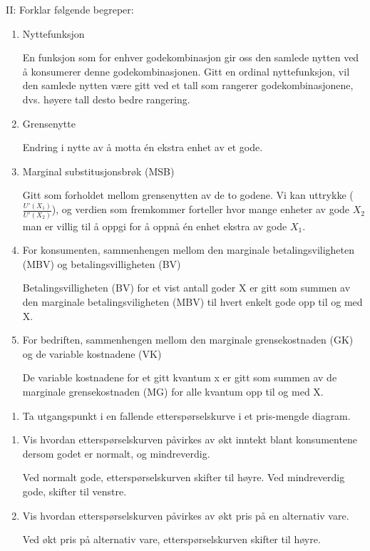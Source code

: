 \documentclass[
  letterpaper,
  DIV=11,
  numbers=noendperiod]{scrartcl}
\providecommand{\tightlist}{%
  \setlength{\itemsep}{0pt}\setlength{\parskip}{0pt}}\usepackage{longtable,booktabs,array}
\begin{document}
II: Forklar følgende begreper:

\begin{enumerate}
\def\labelenumi{\alph{enumi}.}
\tightlist
\item
  Nyttefunksjon

  En funksjon som for enhver godekombinasjon gir oss den samlede nytten
  ved å konsumerer denne godekombinasjonen. Gitt en ordinal
  nyttefunksjon, vil den samlede nytten være gitt ved et tall som
  rangerer godekombinasjonene, dvs. høyere tall desto bedre rangering.
\item
  Grensenytte

  Endring i nytte av å motta én ekstra enhet av et gode.
\item
  Marginal substitusjonsbrøk (MSB)

  Gitt som forholdet mellom grensenytten av de to godene. Vi kan
  uttrykke (\(\frac{U'(X_{1})}{U'(X_{2})}\)), og verdien som fremkommer
  forteller hvor mange enheter av gode \(X_{2}\) man er villig til å
  oppgi for å oppnå én enhet ekstra av gode \(X_{1}\).
\item
  For konsumenten, sammenhengen mellom den marginale betalingsviligheten
  (MBV) og betalingsvilligheten (BV)

  Betalingsvilligheten (BV) for et vist antall goder X er gitt som
  summen av den marginale betalingsviligheten (MBV) til hvert enkelt
  gode opp til og med X.
\item
  For bedriften, sammenhengen mellom den marginale grensekostnaden (GK)
  og de variable kostnadene (VK)

  De variable kostnadene for et gitt kvantum x er gitt som summen av de
  marginale grensekostnaden (MG) for alle kvantum opp til og med X.
\end{enumerate}

\begin{enumerate}
\def\labelenumi{\Roman{enumi}.}
\setcounter{enumi}{2}
\tightlist
\item
  Ta utgangspunkt i en fallende etterspørselskurve i et pris-mengde
  diagram.
\end{enumerate}

\begin{enumerate}
\def\labelenumi{\alph{enumi}.}
\tightlist
\item
  Vis hvordan etterspørselskurven påvirkes av økt inntekt blant
  konsumentene dersom godet er normalt, og mindreverdig.

  Ved normalt gode, etterspørselskurven skifter til høyre. Ved
  mindreverdig gode, skifter til venstre.
\item
  Vis hvordan etterspørselskurven påvirkes av økt pris på en alternativ
  vare.

  Ved økt pris på alternativ vare, etterspørselskurven skifter til
  høyre.
\end{enumerate}
\end{document}
